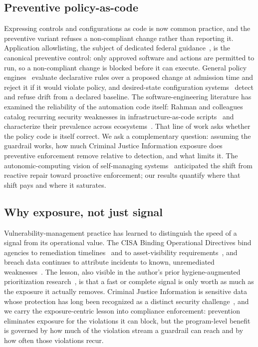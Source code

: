 \documentclass[journal]{IEEEtran}
\begin{document}
\subsection{Preventive policy-as-code}
Expressing controls and configurations as code is now common practice, and the preventive variant
refuses a non-compliant change rather than reporting it. Application allowlisting, the subject of
dedicated federal guidance~\cite{nist80167}, is the canonical preventive control: only approved
software and actions are permitted to run, so a non-compliant change is blocked before it can
execute. General policy engines~\cite{opa} evaluate declarative rules over a proposed change at
admission time and reject it if it would violate policy, and desired-state configuration
systems~\cite{powershelldsc} detect and refuse drift from a declared baseline. The
software-engineering literature has examined the reliability of the automation code itself: Rahman
and colleagues catalog recurring security weaknesses in infrastructure-as-code
scripts~\cite{rahman2019seven} and characterize their prevalence across
ecosystems~\cite{rahman2021different}. That line of work asks whether the policy code is itself
correct. We ask a complementary question: assuming the guardrail works, how much Criminal Justice
Information exposure does preventive enforcement remove relative to detection, and what limits it.
The autonomic-computing vision of self-managing systems~\cite{kephart2003vision} anticipated the
shift from reactive repair toward proactive enforcement; our results quantify where that shift pays
and where it saturates.

\subsection{Why exposure, not just signal}
Vulnerability-management practice has learned to distinguish the speed of a signal from its
operational value. The CISA Binding Operational Directives bind agencies to remediation
timelines~\cite{cisabod2201} and to asset-visibility requirements~\cite{cisabod2301}, and breach
data continues to attribute incidents to known, unremediated weaknesses~\cite{verizon2026dbir}. The
lesson, also visible in the author's prior hygiene-augmented prioritization
research~\cite{paper4hygieneprio,paper1vulnprio}, is that a fast or complete signal is only worth
as much as the exposure it actually removes. Criminal Justice Information is sensitive data whose
protection has long been recognized as a distinct security
challenge~\cite{bertino2005database}, and we carry the exposure-centric lesson into compliance
enforcement: prevention eliminates exposure for the violations it can block, but the program-level
benefit is governed by how much of the violation stream a guardrail can reach and by how often
those violations recur.
\end{document}

